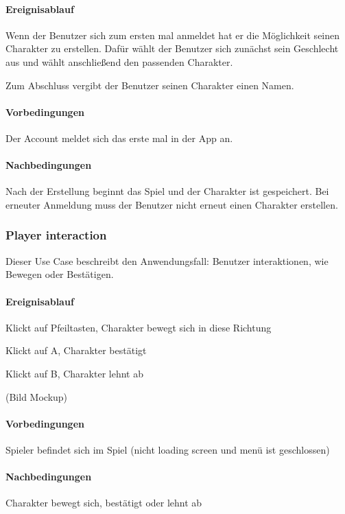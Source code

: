 			\paragraph{Ereignisablauf}
				Wenn der Benutzer sich zum ersten mal anmeldet hat er die Möglichkeit seinen Charakter zu erstellen. Dafür wählt der Benutzer sich zunächst sein Geschlecht aus und wählt anschließend den passenden Charakter.
			
				Zum Abschluss vergibt der Benutzer seinen Charakter einen Namen.
	
			\paragraph{Vorbedingungen}
				Der Account meldet sich das erste mal in der App an.
			
			\paragraph{Nachbedingungen}
				Nach der Erstellung beginnt das Spiel und der Charakter ist gespeichert. Bei erneuter Anmeldung muss der Benutzer nicht erneut einen Charakter erstellen.
	
		\subsubsection{Player interaction}
			Dieser Use Case beschreibt den Anwendungsfall: Benutzer interaktionen, wie Bewegen oder Bestätigen.
			
			\paragraph{Ereignisablauf}
				Klickt auf Pfeiltasten, Charakter bewegt sich in diese Richtung
			
				Klickt auf A, Charakter bestätigt
			
				Klickt auf B, Charakter lehnt ab
			
				(Bild Mockup)
			
			\paragraph{Vorbedingungen}
				Spieler befindet sich im Spiel (nicht loading screen und menü ist geschlossen)
			
			\paragraph{Nachbedingungen}
				Charakter bewegt sich, bestätigt oder lehnt ab
	
